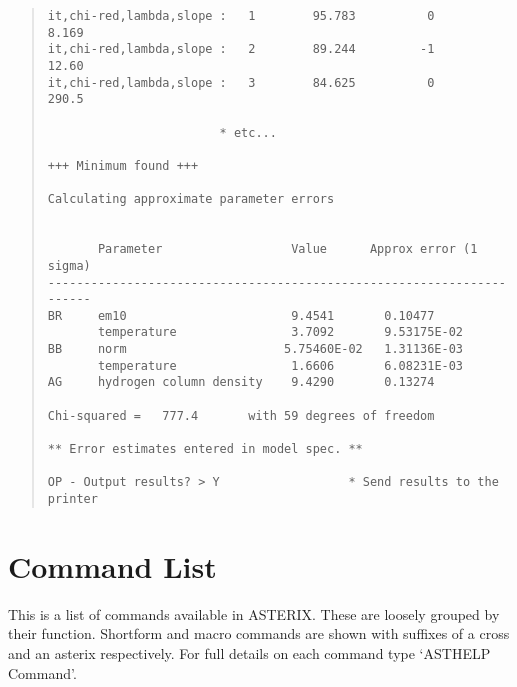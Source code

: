 \begin{quote}
\begin{verbatim}
it,chi-red,lambda,slope :   1        95.783          0      8.169    
it,chi-red,lambda,slope :   2        89.244         -1      12.60    
it,chi-red,lambda,slope :   3        84.625          0      290.5    

                        * etc...

+++ Minimum found +++

Calculating approximate parameter errors


       Parameter                  Value      Approx error (1 sigma)
----------------------------------------------------------------------
BR     em10                       9.4541       0.10477    
       temperature                3.7092       9.53175E-02
BB     norm                      5.75460E-02   1.31136E-03
       temperature                1.6606       6.08231E-03
AG     hydrogen column density    9.4290       0.13274    

Chi-squared =   777.4       with 59 degrees of freedom

** Error estimates entered in model spec. **

OP - Output results? > Y                  * Send results to the printer

\end{verbatim}
\end{quote}

\newpage

\section{Command List }

This is a list of commands available in ASTERIX. These are loosely
grouped by their function. Shortform and macro commands are shown
with suffixes of a cross and an asterix respectively. 
For full details on each command type  `ASTHELP Command'.

